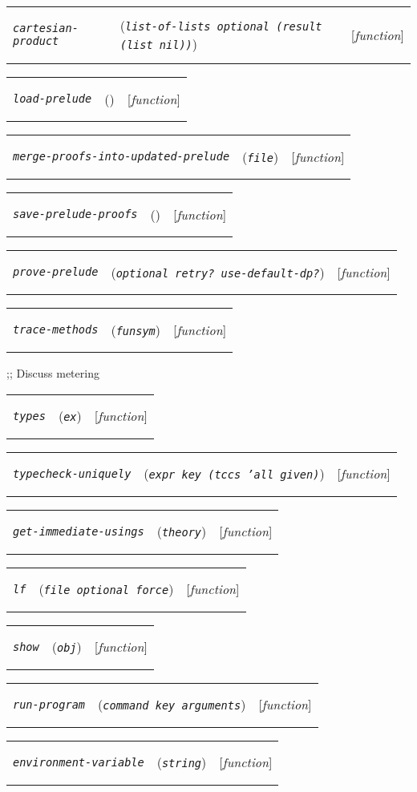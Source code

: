 \documentclass[12pt]{book}
\makeatletter
\def\ampoptional{{\smaller\sc {\smaller\smaller \&}optional\ }}
\def\ampkey{{\smaller\sc {\smaller\smaller \&}key\ }}
\newenvironment{function}[3]%
{\par\noindent\begin{boxedminipage}{\textwidth}%
 \par\noindent\begin{tabularx}{\linewidth}{l>{\raggedright}Xr}%
 \functionhtgt{#1}&(\texttt{\textit{#2}})&[\emph{#3}]%
 \end{tabularx}\par\flushright\begin{minipage}{.97\textwidth}}
{\end{minipage}\end{boxedminipage}}
\newcommand{\functionnm}[1]{\texttt{\textit{#1}}}
\newcommand{\functionhtgt}[1]{\hypertarget{#1}{\functionnm{#1}}\index{#1@\functionnm{#1}|underline}}
\newenvironment{lispfunction}[2]%
{\begin{function}{#1}{#2}{function}}{\end{function}}
\makeatother
\begin{document}
\begin{lispfunction}{cartesian-product}
  {list-of-lists \ampoptional \textup{(}result \textup{(list nil)}\textup{)}}
\end{lispfunction}

\begin{lispfunction}{load-prelude}{}
\end{lispfunction}

\begin{lispfunction}{merge-proofs-into-updated-prelude}{file}
\end{lispfunction}

\begin{lispfunction}{save-prelude-proofs}{}
\end{lispfunction}

\begin{lispfunction}{prove-prelude}{\ampoptional retry? use-default-dp?}
\end{lispfunction}

\begin{lispfunction}{trace-methods}{funsym}
\end{lispfunction}

;; Discuss metering

\begin{lispfunction}{types}{ex}
\end{lispfunction}

\begin{lispfunction}{typecheck-uniquely}{expr \ampkey \textup{(}tccs \textup{'all given}\textup{)}}
\end{lispfunction}

\begin{lispfunction}{get-immediate-usings}{theory}
\end{lispfunction}

\begin{lispfunction}{lf}{file \ampoptional force}
\end{lispfunction}

\begin{lispfunction}{show}{obj}
\end{lispfunction}

\begin{lispfunction}{run-program}{command \ampkey arguments}
\end{lispfunction}

\begin{lispfunction}{environment-variable}{string}
\end{lispfunction}
\end{document}
